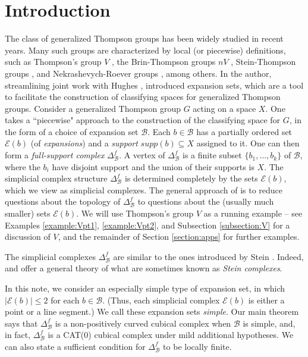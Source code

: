 \documentclass{amsart}
\newtheorem{standing assumption}[theorem]{Standing Assumption}
\begin{document}
\section{Introduction}
The class of generalized Thompson groups has been widely studied in recent years. 
 Many such groups are characterized by local (or piecewise) definitions, such as Thompson's group $V$ \cite{CFP}, the Brin-Thompson groups $nV$ \cite{BrinHighD}, Stein-Thompson groups \cite{Stein}, and Nekrashevych-Roever groups \cite{Rover,Nek}, among others.  
In \cite{Farley} the author, streamlining joint work with Hughes \cite{FH2}, introduced expansion sets, which are a tool to facilitate the construction of classifying spaces for generalized Thompson groups.  Consider a generalized Thompson group $G$ acting on a space $X$. 
One takes a ``piecewise" approach to the construction of the classifying space for $G$, in the form of a choice of expansion set $\mathcal{B}$. 
Each $b \in \mathcal{B}$ has a partially ordered set $\mathcal{E}(b)$ (of \emph{expansions}) and a \emph{support} $supp(b) \subseteq X$ assigned to it. One can then form a \emph{full-support complex} $\Delta^{f}_{\mathcal{B}}$. A vertex of
$\Delta^{f}_{\mathcal{B}}$ is a finite subset $\{ b_{1}, \ldots, b_{k} \}$ of $\mathcal{B}$, where
the $b_{i}$ have disjoint support and the union of their supports is $X$. The simplicial complex structure $\Delta^{f}_{\mathcal{B}}$ is
determined completely by the sets $\mathcal{E}(b)$, which we view as simplicial complexes. The general approach of \cite{Farley} is to reduce questions about the topology of $\Delta^{f}_{\mathcal{B}}$ to questions about the (usually much smaller) sets $\mathcal{E}(b)$. We will use Thompson's group $V$  as a running example -- see Examples \ref{example:Vpt1}, \ref{example:Vpt2}, and Subsection \ref{subsection:V} for a discussion of
$V$, and the remainder of Section \ref{section:apps} for further examples.

The simplicial complexes $\Delta^{f}_{\mathcal{B}}$ are similar to the ones introduced by Stein \cite{Stein}. Indeed, \cite{Farley} and \cite{FH2} offer a general theory 
of what are sometimes known as \emph{Stein complexes}. 

In this note, we consider an especially simple type of expansion set, in which $|\mathcal{E}(b)| \leq 2$ for each $b \in \mathcal{B}$. (Thus, each simplicial complex $\mathcal{E}(b)$ is either a point or a line segment.) We call these expansion sets \emph{simple}. Our main theorem says that $\Delta^{f}_{\mathcal{B}}$ is a non-positively curved cubical complex when $\mathcal{B}$ is simple, and, in fact,
$\Delta^{f}_{\mathcal{B}}$ is a CAT(0) cubical complex under mild additional hypotheses. We can also state a sufficient condition for $\Delta^{f}_{\mathcal{B}}$ to be locally finite.
\end{document}
